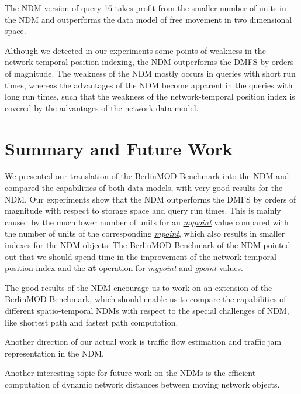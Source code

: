 \documentclass[a4paper]{article}
\newcommand{\bmodb} {BerlinMOD Benchmark}
\newcommand{\op}[1]{\textbf{#1}}
\newcommand{\dt}[1]{\textsl{\underline{#1}}}
\begin{document}
The NDM version of query 16 takes profit from the smaller number
of units in the NDM and outperforms the data model of free movement
in two dimensional space.

Although we detected in our experiments some points of weakness in the network-temporal
position indexing, the NDM outperforms the DMFS by orders of magnitude. The weakness
of the NDM mostly occurs in queries with short run times, whereas the advantages
of the NDM become apparent in the queries with long run times, such that the weakness
of the network-temporal position index is covered by the advantages of the network
data model.
\section{Summary and Future Work}
\label{sec:summary}
We presented our translation of the \bmodb{} into the NDM and
compared the capabilities of both data models, with very good results for the
NDM. Our experiments show that the NDM outperforms
the DMFS by orders of magnitude with respect to storage space and query run times.
This is mainly caused by the much lower number of units for an \dt{mgpoint} value
compared with the number of units of the corresponding \dt{mpoint}, which also
results in smaller indexes for the NDM objects. The \bmodb{} of the NDM pointed out
that we should spend time in the improvement of the network-temporal position index
and the \op{at} operation for \dt{mgpoint} and \dt{gpoint} values.

The good results of the NDM encourage us to work on an extension
of the \bmodb{}, which should enable us to compare the capabilities of different
spatio-temporal NDMs with respect to the special challenges of
NDM, like shortest path and fastest path computation.

Another direction of our actual work is traffic flow estimation and traffic jam
representation in the NDM.

Another interesting topic for future work on the NDMs is the efficient
computation of dynamic network distances between moving network objects.
{}

\end{document}
